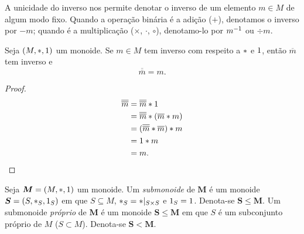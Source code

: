 \begin{notation}
A unicidade do inverso nos permite denotar o inverso de um elemento $m \in M$ de algum modo fixo. Quando a operação binária é a adição ($+$), denotamos o inverso por $-m$; quando é a multiplicação ($\times$, $\cdot$, $\circ$), denotamo-lo por $m^{-1}$ ou $\div m$.
\end{notation}

\begin{proposition}
Seja $(M,\ast,1)$ um monoide. Se $m \in M$ tem inverso com respeito a $\ast$ e $1$, então $\overline m$ tem inverso e
	\begin{equation*}
	\overline{\overline{m}}=m.
	\end{equation*}
\end{proposition}
\begin{proof}
	\begin{align*}
	\overline{\overline m} &= \overline{\overline m}  \ast  1 \\
		&= \overline{\overline m}  \ast  (\overline m  \ast  m) \\
		&= (\overline{\overline m}  \ast  \overline m)  \ast  m \\
		&= 1  \ast  m \\
		&= m.
	\end{align*}
\end{proof}

\begin{definition}
Seja $\bm M=(M,\ast,1)$ um monoide. Um \emph{submonoide} de $\bm M$ é um monoide $\bm S=(S,\ast _S,1_S)$ em que $S \subseteq M$, $\ast _S= \ast |_{S \times S}$ e $1_S=1$. Denota-se $\bm S \leq \bm M$. Um submonoide \emph{próprio} de $\bm M$ é um monoide $\bm S \leq \bm M$ em que $S$ é um subconjunto próprio de $M$ ($S \subset M$). Denota-se $\bm S < \bm M$.
\end{definition}

